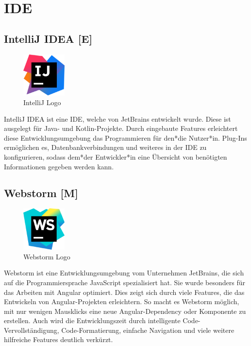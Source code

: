 \section{IDE}
\subsection{IntelliJ IDEA [E]}

\begin{figure}
  \begin{center}
    \includegraphics[width=0.2\textwidth]{pics/intellij_logo.png}
   \caption{IntelliJ Logo}
  \end{center}
\end{figure}

IntelliJ IDEA ist eine IDE, welche von JetBrains entwickelt wurde. Diese ist ausgelegt für Java- und Kotlin-Projekte. 
Durch eingebaute Features erleichtert diese Entwicklungsumgebung das Programmieren für den*die Nutzer*in. 
Plug-Ins ermöglichen es, Datenbankverbindungen und weiteres in der IDE zu konfigurieren, sodass dem*der Entwickler*in eine Übersicht von benötigten Informationen gegeben werden kann. \cite{IntelliJIDEA}
\subsection{Webstorm [M]}
\begin{figure}
  \begin{center}
    \includegraphics[width=0.2\textwidth]{pics/webstorm_logo.png}
   \caption{Webstorm Logo}
  \end{center}
\end{figure}
Webstorm ist eine Entwicklungsumgebung vom Unternehmen JetBrains, die sich auf die Programmiersprache JavaScript spezialisiert hat. Sie wurde besonders für das Arbeiten mit Angular optimiert. Dies zeigt sich durch viele Features, die das Entwickeln von Angular-Projekten erleichtern. So macht es Webstorm möglich, mit nur wenigen Mausklicks eine neue Angular-Dependency oder Komponente zu erstellen. Auch wird die Entwicklungszeit durch intelligente Code-Vervollständigung, Code-Formatierung, einfache Navigation und viele weitere hilfreiche Features deutlich verkürzt. \cite{Webstorm}

